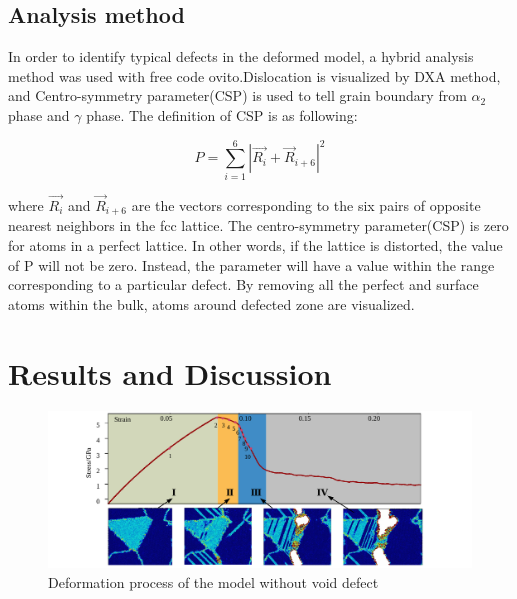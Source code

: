 \documentclass[Unknown,article,submit,moreauthors,pdftex,10pt,a4paper]{Definitions/mdpi}
\begin{document}
\subsection{Analysis method}
In order to identify typical defects in the deformed model, a hybrid analysis method was used with free code ovito\cite{Stukowski2010a}.Dislocation is visualized by DXA method, and Centro-symmetry parameter(CSP) is used to tell grain boundary from  $\alpha_2$ phase and $\gamma$ phase. The definition of CSP is as following:

	\begin{equation} \label{eq:csp} 
	P = \displaystyle\sum_{i=1}^{6}|\vec{R_i}+{\vec{R}}_{i+6}|^2
	\end{equation}
	
where $\vec{R_i}$ and ${\vec{R}}_{i+6}$ are the vectors corresponding to the six pairs of opposite nearest neighbors in the fcc lattice. The centro-symmetry parameter(CSP) is zero for atoms in a perfect lattice. In other words, if the lattice is distorted, the value of P will not be zero. Instead, the parameter will have a value within the range corresponding to a particular defect. By removing all the perfect and surface atoms within the bulk, atoms around defected zone are visualized. 
 
\section{Results and Discussion}\label{section:RD}

\begin{figure}[ht]
	\centering
	\includegraphics[width=1\linewidth]{img/tens}
	\caption{Deformation process of the model without void defect}
	\label{fig:deformation-pf}
\end{figure}
\end{document}
